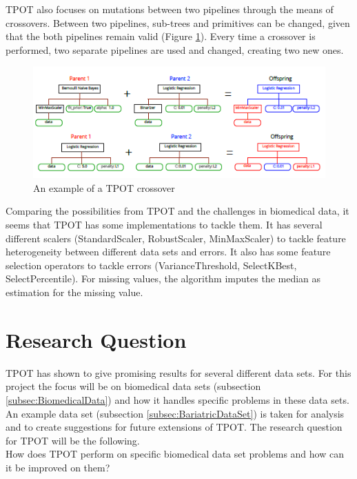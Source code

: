 \documentclass[10pt,a4paper]{article}
\begin{document}
	TPOT also focuses on mutations between two pipelines through the means of crossovers. Between two pipelines, sub-trees and primitives can be changed, given that the both pipelines remain valid (Figure \ref{fig:TPOTCrossover}). Every time a crossover is performed, two separate pipelines are used and changed, creating two new ones.
	
	\begin{figure}[h!]
		\includegraphics[scale=1]{TPOTCrossover.png}
		\caption{An example of a TPOT crossover\cite{Gijsbers2017Thesis}}
		\label{fig:TPOTCrossover}
	\end{figure}
	
	Comparing the possibilities from TPOT and the challenges in biomedical data, it seems that TPOT has some implementations to tackle them. It has several different scalers (StandardScaler, RobustScaler, MinMaxScaler) to tackle feature heterogeneity between different data sets and errors. It also has some feature selection operators to tackle errors (VarianceThreshold, SelectKBest, SelectPercentile). For missing values, the algorithm imputes the median as estimation for the missing value.
	
	\section{Research Question}
	
	TPOT has shown to give promising results for several different data sets.\cite{Gijsbers2017Thesis} For this project the focus will be on biomedical data sets (subsection \ref{subsec:BiomedicalData}) and how it handles specific problems in these data sets. An example data set (subsection \ref{subsec:BariatricDataSet}) is taken for analysis and to create suggestions for future extensions of TPOT. The research question for TPOT will be the following.\\
	
	How does TPOT perform on specific biomedical data set problems and how can it be improved on them?\\
	
\end{document}
